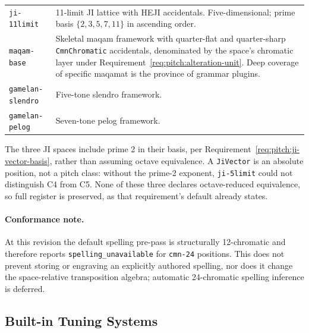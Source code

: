 \documentclass[11pt,letterpaper]{report}
\newcounter{requirement}[chapter]
\begin{document}
\begin{longtable}{p{3.5cm} p{10cm}}
  \texttt{ji-11limit} & 11-limit JI lattice with HEJI accidentals.
  Five-dimensional; prime basis $\{2, 3, 5, 7, 11\}$ in ascending
  order. \\
  \texttt{maqam-base} & Skeletal maqam framework with quarter-flat
  and quarter-sharp \texttt{CmnChromatic} accidentals, denominated by the
  space's chromatic layer under Requirement~\ref{req:pitch:alteration-unit}.
  Deep coverage of specific maqamat is the province of grammar plugins. \\
  \texttt{gamelan-slendro} & Five-tone slendro framework. \\
  \texttt{gamelan-pelog} & Seven-tone pelog framework. \\
  \bottomrule
\end{longtable}

\begin{rationale}
  The three JI spaces include prime 2 in their basis, per
  Requirement~\ref{req:pitch:ji-vector-basis}, rather than assuming octave
  equivalence. A \texttt{JiVector} is an absolute position, not a pitch
  class: without the prime-2 exponent, \texttt{ji-5limit} could not
  distinguish C4 from C5. None of these three declares octave-reduced
  equivalence, so full register is preserved, as that requirement's
  default already states.
\end{rationale}

\paragraph{Conformance note.}
At this revision the default spelling pre-pass is structurally
12-chromatic and therefore reports \texttt{spelling\_unavailable} for
\texttt{cmn-24} positions. This does not prevent storing or engraving an
explicitly authored spelling, nor does it change the space-relative
transposition algebra; automatic 24-chromatic spelling inference is deferred.

\subsection{Built-in Tuning Systems}
\end{document}
